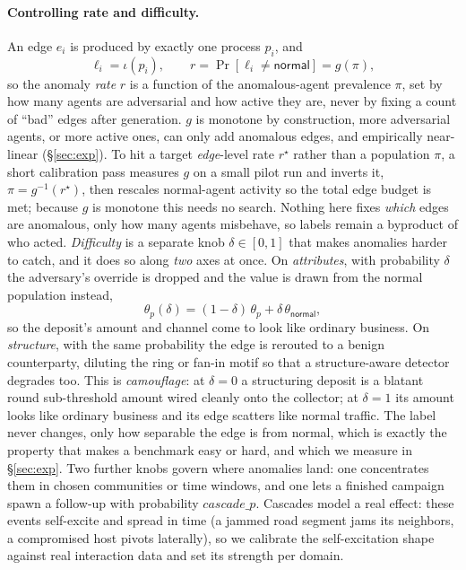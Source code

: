 \documentclass[sigconf,review,anonymous]{acmart}
\begin{document}
\paragraph{Controlling rate and difficulty.}
An edge $e_i$ is produced by exactly one process $p_i$, and
\begin{equation}
\ell_i=\iota(p_i),\qquad r=\Pr[\ell_i\neq\textsf{normal}]=g(\pi),\label{eq:rate}
\end{equation}
so the anomaly \emph{rate} $r$ is a function of the anomalous-agent prevalence
$\pi$, set by how many agents are adversarial and how active they are, never by
fixing a count of ``bad'' edges after generation. $g$ is monotone by
construction, more adversarial agents, or more active ones, can only add
anomalous edges, and empirically near-linear (\S\ref{sec:exp}). To hit a target
\emph{edge}-level rate $r^\star$ rather than a population $\pi$, a short calibration
pass measures $g$ on a small pilot run and inverts it, $\pi=g^{-1}(r^\star)$, then
rescales normal-agent activity so the total edge budget is met; because $g$ is
monotone this needs no search. Nothing here fixes \emph{which} edges are
anomalous, only how many agents misbehave, so labels remain a byproduct
of who acted. \emph{Difficulty} is a separate knob $\delta\in[0,1]$ that makes
anomalies harder to catch, and it does so along \emph{two} axes at once. On
\emph{attributes}, with probability $\delta$ the adversary's override is dropped and the
value is drawn from the normal population instead,
\begin{equation}
\theta_p(\delta)=(1-\delta)\,\theta_p+\delta\,\theta_{\textsf{normal}},\label{eq:camou}
\end{equation}
so the deposit's amount and channel come to look like ordinary business. On
\emph{structure}, with the same probability the edge is rerouted to a benign
counterparty, diluting the ring or fan-in motif so that a structure-aware detector
degrades too. This is \emph{camouflage}: at $\delta{=}0$ a structuring deposit is a
blatant round sub-threshold amount wired cleanly onto the collector; at $\delta{=}1$ its
amount looks like ordinary business and its edge scatters like normal traffic. The label
never changes, only how separable the edge is from normal, which is exactly the
property that makes a benchmark easy or hard, and which we measure in \S\ref{sec:exp}.
Two further knobs govern where anomalies land: one concentrates them in chosen
communities or time windows, and one lets a finished campaign spawn a follow-up with
probability $\mathit{cascade\_p}$. Cascades model a real effect: these events
self-excite and spread in time (a jammed road segment jams its neighbors, a compromised
host pivots laterally), so we calibrate the self-excitation shape against real
interaction data and set its strength per domain.
\end{document}
